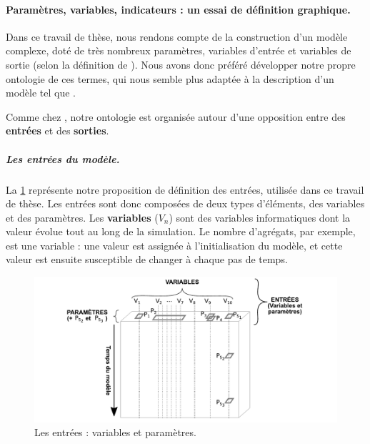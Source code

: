 \paragraph{Paramètres, variables, indicateurs : un essai de définition graphique.}\label{subsubsec:mes_definitions_params}

Dans ce travail de thèse, nous rendons compte de la construction d'un modèle complexe, doté de très nombreux paramètres, variables d'entrée et variables de sortie (selon la définition de \citeauthor{balci_validation_1994}).
Nous avons donc préféré développer notre propre \og ontologie\fg{} de ces termes, qui nous semble plus adaptée à la description d'un modèle tel que \simfeodal{}.

Comme chez \citeauthor{balci_validation_1994}, notre ontologie est organisée autour d'une opposition entre des \textbf{entrées} et des \textbf{sorties}.

\subparagraph{Les entrées du modèle.}
La \cref{fig:parametres-these-entrees} représente notre proposition de définition des entrées, utilisée dans ce travail de thèse.
Les entrées sont donc composées de deux types d'éléments, des variables et des paramètres.
Les \textbf{variables} ($V_n$) sont des variables informatiques dont la valeur évolue tout au long de la simulation.
Le nombre d'agrégats, par exemple, est une variable : une valeur est assignée à l'initialisation du modèle, et cette valeur est ensuite susceptible de changer à chaque pas de temps.

\begin{figure}[H]
	\includegraphics[width=\linewidth]{img/schemas_params_1_entrees.pdf}
	\caption{Les entrées : variables et paramètres.} 
	\label{fig:parametres-these-entrees} 
\end{figure}

